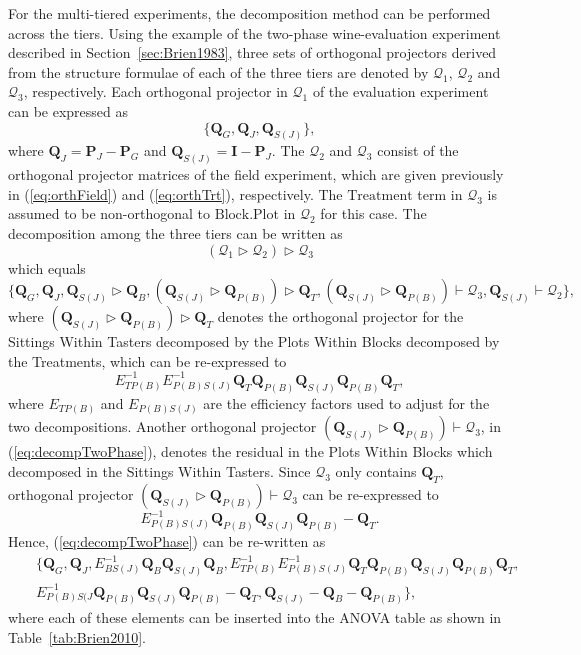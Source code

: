 \documentclass[11pt,a4paper]{article}
\newcommand{\mP}{\mathbf{P}}
\newcommand{\I}{\mathbf{I}}
\newcommand{\Q}{\mathbf{Q}}
\begin{document}
For the multi-tiered experiments, the decomposition method can be performed across the tiers. Using the example of the two-phase wine-evaluation experiment described in Section~\ref{sec:Brien1983}, three sets of orthogonal projectors derived from the structure formulae of each of the three tiers are denoted by $\mathcal{Q}_1$, $\mathcal{Q}_2$ and $\mathcal{Q}_3$, respectively. Each orthogonal projector in $\mathcal{Q}_1$ of the evaluation experiment can be expressed as  
\[\{\Q_{G}, \Q_{J}, \Q_{S(J)}\}, \]
where
$\Q_{J} =  \mP_{J} - \mP_G$ and $\Q_{S(J)} = \I  - \mP_{J}$.
The $\mathcal{Q}_2$ and $\mathcal{Q}_3$ consist of the orthogonal projector matrices of the field experiment, which are given previously in (\ref{eq:orthField}) and (\ref{eq:orthTrt}), respectively. The $\mathrm{Treatment}$ term in $\mathcal{Q}_3$ is assumed to be non-orthogonal to $\mathrm{Block.Plot}$ in $\mathcal{Q}_2$ for this case. The decomposition among the three tiers can be written as 
\[(\mathcal{Q}_1 \rhd \mathcal{Q}_2) \rhd \mathcal{Q}_3\]
which equals 
\begin{equation}\label{eq:decompTwoPhase}
\{\Q_{G}, \Q_{J}, \Q_{S(J)} \rhd \Q_B, (\Q_{S(J)} \rhd \Q_{P(B)}) \rhd \Q_{T}, (\Q_{S(J)} \rhd \Q_{P(B)}) \vdash \mathcal{Q}_3, \Q_{S(J)} \vdash \mathcal{Q}_2\},
\end{equation} 
where $(\Q_{S(J)} \rhd \Q_{P(B)}) \rhd \Q_{T}$ denotes the orthogonal projector for the Sittings Within Tasters decomposed by the Plots Within Blocks decomposed by the Treatments, which can be re-expressed to 
\[
E_{TP(B)}^{-1}E_{P(B)S(J)}^{-1} \Q_{T}\Q_{P(B)}\Q_{S(J)} \Q_{P(B)}\Q_{T},
\]
where $E_{TP(B)}$ and $E_{P(B)S(J)}$ are the efficiency factors used to adjust for the two decompositions. Another orthogonal projector $(\Q_{S(J)} \rhd \Q_{P(B)}) \vdash \mathcal{Q}_3$, in  (\ref{eq:decompTwoPhase}), denotes the residual in the Plots Within Blocks which decomposed in the Sittings Within Tasters. Since $\mathcal{Q}_3$ only contains $\Q_{T}$, orthogonal projector $(\Q_{S(J)} \rhd \Q_{P(B)}) \vdash \mathcal{Q}_3$ can be re-expressed to 
\[
E_{P(B)S(J)}^{-1}\Q_{P(B)}\Q_{S(J)} \Q_{P(B)} - \Q_{T}.
\]
Hence, (\ref{eq:decompTwoPhase}) can be re-written as 
\begin{eqnarray}
\nonumber &&\{\Q_{G}, \Q_{J}, E_{BS(J)}^{-1}\Q_B\Q_{S(J)}\Q_B,  E_{TP(B)}^{-1}E_{P(B)S(J)}^{-1} \Q_{T}\Q_{P(B)}\Q_{S(J)} \Q_{P(B)}\Q_{T},\\
\label{eq:decompTwoPhaseExpaned}&& E_{P(B)S(J}^{-1}\Q_{P(B)}\Q_{S(J)} \Q_{P(B)} - \Q_{T}, \Q_{S(J)} - \Q_B - \Q_{P(B)}\},
\end{eqnarray}
where each of these elements can be inserted into the ANOVA table as shown in Table~\ref{tab:Brien2010}.
\end{document}
